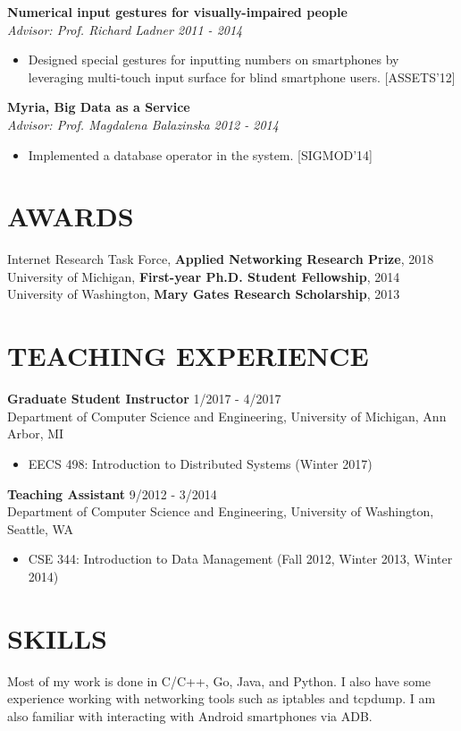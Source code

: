 \documentclass[zhemargin]{res}
\begin{document}
\begin{resume}
	\textbf{Numerical input gestures for visually-impaired people}\\
    \textit{Advisor: Prof. Richard Ladner \hfill 2011 - 2014}
	\begin{itemize}
    \item Designed special gestures for inputting numbers on smartphones
      by leveraging multi-touch input surface for blind smartphone users. [ASSETS'12]
	\end{itemize}

	\textbf{Myria, Big Data as a Service}\\
    \textit{Advisor: Prof. Magdalena Balazinska \hfill 2012 - 2014}
	\begin{itemize}
    \item Implemented a database operator in the system. [SIGMOD'14]
	\end{itemize}

\section{\small AWARDS}
  Internet Research Task Force, \textbf{Applied Networking Research Prize}, 2018 \\
  University of Michigan, \textbf{First-year Ph.D. Student Fellowship}, 2014 \\
  University of Washington, \textbf{Mary Gates Research Scholarship}, 2013 \\


\section{\small TEACHING EXPERIENCE}
	\textbf{Graduate Student Instructor} \hfill 1/2017 - 4/2017 \\
	Department of Computer Science and Engineering, University of Michigan, Ann Arbor, MI
	\begin{itemize}
      \item EECS 498: Introduction to Distributed Systems (Winter 2017)
	\end{itemize}
	\textbf{Teaching Assistant} \hfill 9/2012 - 3/2014 \\
	Department of Computer Science and Engineering, University of Washington, Seattle, WA
	\begin{itemize}
      \item CSE 344: Introduction to Data Management (Fall 2012, Winter 2013, Winter 2014)
	\end{itemize}

\section{\small SKILLS}
  Most of my work is done in C/C++, Go, Java, and Python. I also have some
  experience working with networking tools such as iptables and tcpdump. I am
  also familiar with interacting with Android smartphones via ADB.

\end{resume}
\end{document}
